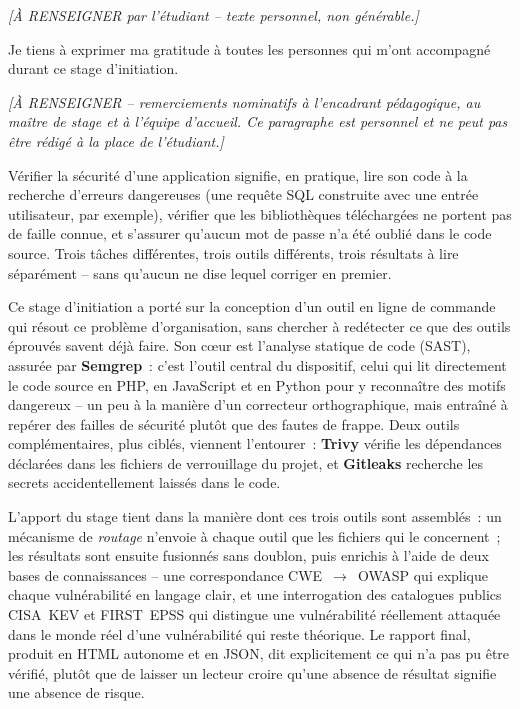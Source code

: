 \documentclass[12pt,a4paper,oneside]{report}
\begin{document}
\vspace{2cm}
\begin{center}
\textit{[\`A RENSEIGNER par l'\'etudiant -- texte personnel, non g\'en\'erable.]}
\end{center}

Je tiens \`a exprimer ma gratitude \`a toutes les personnes qui m'ont accompagn\'e durant ce stage d'initiation.

\textit{[\`A RENSEIGNER -- remerciements nominatifs \`a l'encadrant p\'edagogique, au ma\^itre de stage et \`a l'\'equipe d'accueil. Ce paragraphe est personnel et ne peut pas \^etre r\'edig\'e \`a la place de l'\'etudiant.]}

V\'erifier la s\'ecurit\'e d'une application signifie, en pratique, lire son code \`a la recherche d'erreurs dangereuses (une requ\^ete SQL construite avec une entr\'ee utilisateur, par exemple), v\'erifier que les biblioth\`eques t\'el\'echarg\'ees ne portent pas de faille connue, et s'assurer qu'aucun mot de passe n'a \'et\'e oubli\'e dans le code source. Trois t\^aches diff\'erentes, trois outils diff\'erents, trois r\'esultats \`a lire s\'epar\'ement -- sans qu'aucun ne dise lequel corriger en premier.

Ce stage d'initiation a port\'e sur la conception d'un outil en ligne de commande qui r\'esout ce probl\`eme d'organisation, sans chercher \`a red\'etecter ce que des outils \'eprouv\'es savent d\'ej\`a faire. Son c\oe ur est l'analyse statique de code (SAST), assur\'ee par \textbf{Semgrep}~: c'est l'outil central du dispositif, celui qui lit directement le code source en PHP, en JavaScript et en Python pour y reconna\^itre des motifs dangereux -- un peu \`a la mani\`ere d'un correcteur orthographique, mais entra\^in\'e \`a rep\'erer des failles de s\'ecurit\'e plut\^ot que des fautes de frappe. Deux outils compl\'ementaires, plus cibl\'es, viennent l'entourer~: \textbf{Trivy} v\'erifie les d\'ependances d\'eclar\'ees dans les fichiers de verrouillage du projet, et \textbf{Gitleaks} recherche les secrets accidentellement laiss\'es dans le code.

L'apport du stage tient dans la mani\`ere dont ces trois outils sont assembl\'es~: un m\'ecanisme de \emph{routage} n'envoie \`a chaque outil que les fichiers qui le concernent~; les r\'esultats sont ensuite fusionn\'es sans doublon, puis enrichis \`a l'aide de deux bases de connaissances -- une correspondance CWE~$\to$~OWASP qui explique chaque vuln\'erabilit\'e en langage clair, et une interrogation des catalogues publics CISA~KEV et FIRST~EPSS qui distingue une vuln\'erabilit\'e r\'eellement attaqu\'ee dans le monde r\'eel d'une vuln\'erabilit\'e qui reste th\'eorique. Le rapport final, produit en HTML autonome et en JSON, dit explicitement ce qui n'a pas pu \^etre v\'erifi\'e, plut\^ot que de laisser un lecteur croire qu'une absence de r\'esultat signifie une absence de risque.
\end{document}
